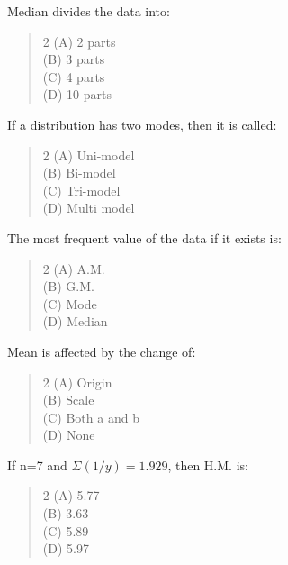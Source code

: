\documentclass[11pt,a4paper]{article}
\begin{document}
\begin{mcqlist}
\item Median divides the data into:
\begin{quote}\begin{multicols}{2}
\noindent (A) 2 parts \\
(B) 3 parts \\
(C) 4 parts \\
(D) 10 parts
\end{multicols}\end{quote}

\item If a distribution has two modes, then it is called:
\begin{quote}\begin{multicols}{2}
\noindent (A) Uni-model \\
(B) Bi-model \\
(C) Tri-model \\
(D) Multi model
\end{multicols}\end{quote}

\item The most frequent value of the data if it exists is:
\begin{quote}\begin{multicols}{2}
\noindent (A) A.M. \\
(B) G.M. \\
(C) Mode \\
(D) Median
\end{multicols}\end{quote}

\item Mean is affected by the change of:
\begin{quote}\begin{multicols}{2}
\noindent (A) Origin \\
(B) Scale \\
(C) Both a and b \\
(D) None
\end{multicols}\end{quote}

\item If n=7 and $\Sigma (1/y) = 1.929$, then H.M. is:
\begin{quote}\begin{multicols}{2}
\noindent (A) 5.77 \\
(B) 3.63 \\
(C) 5.89 \\
(D) 5.97
\end{multicols}\end{quote}


\end{mcqlist}
\end{document}
